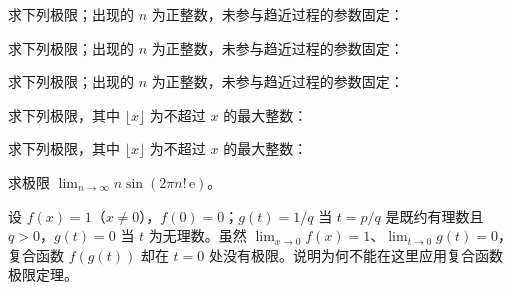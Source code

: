 \newpage
\noindent\begin{minipage}{\textwidth}
求下列极限；出现的 $n$ 为正整数，未参与趋近过程的参数固定：
\end{minipage}\par\vfill
\noindent\begin{minipage}{\textwidth}
求下列极限；出现的 $n$ 为正整数，未参与趋近过程的参数固定：
\end{minipage}\par\vfill
\noindent\begin{minipage}{\textwidth}
求下列极限；出现的 $n$ 为正整数，未参与趋近过程的参数固定：
\end{minipage}\par\vfill
\newpage
\noindent\begin{minipage}{\textwidth}
求下列极限，其中 $\lfloor x\rfloor$ 为不超过 $x$ 的最大整数：
\end{minipage}\par\vfill
\noindent\begin{minipage}{\textwidth}
求下列极限，其中 $\lfloor x\rfloor$ 为不超过 $x$ 的最大整数：
\end{minipage}\par\vfill
\noindent\begin{minipage}{\textwidth}
求极限 $\lim_{n\to\infty}n\sin(2\pi n!\,\mathrm e)$。
\end{minipage}\par\vfill
\newpage
\noindent\begin{minipage}{\textwidth}
设 $f(x)=1$（$x\ne0$），$f(0)=0$；$g(t)=1/q$ 当 $t=p/q$ 是既约有理数且 $q>0$，$g(t)=0$ 当 $t$ 为无理数。虽然 $\lim_{x\to0}f(x)=1$、$\lim_{t\to0}g(t)=0$，复合函数 $f(g(t))$ 却在 $t=0$ 处没有极限。说明为何不能在这里应用复合函数极限定理。
\end{minipage}\par\vfill
